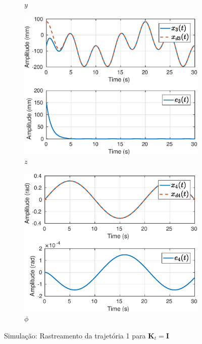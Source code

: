 \begin{figure}[H]
\begin{subfigure}{.5\textwidth}
  \caption{$y$}
  \label{fig:sub2}
\end{subfigure}
\begin{subfigure}{.5\textwidth}
  \centering
  \includegraphics[width=\linewidth]{./img/simul_delay_zoh1/x3.eps}
  \caption{$z$}
  \label{fig:sub1}
\end{subfigure}%
\begin{subfigure}{.5\textwidth}
  \centering
  \includegraphics[width=\linewidth]{./img/simul_delay_zoh1/x4.eps}
  \caption{$\phi$}
  \label{fig:sub2}
\end{subfigure}
\caption{Simulação: Rastreamento da trajetória 1 para $\bm{K}_t = \bm{I}$}
\label{fig:test}
\end{figure}

